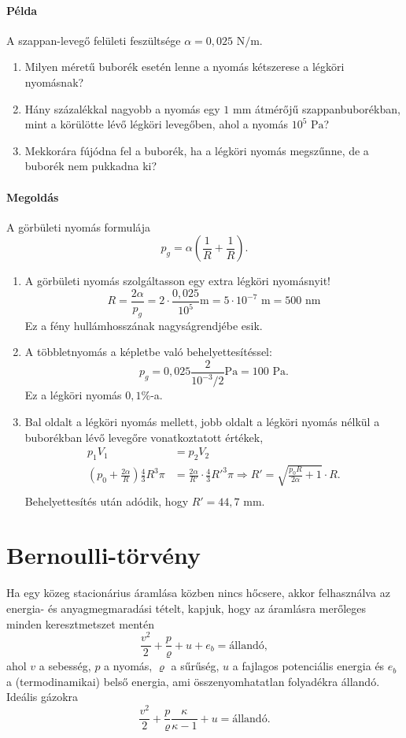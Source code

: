 \documentclass[12pt,a4paper]{scrartcl}
\begin{document}
\paragraph{Példa}
A szappan-levegő felületi feszültsége $\alpha = 0{,}025\text{ N}/\text{m}$. 
\begin{enumerate}
\item  Milyen méretű buborék esetén lenne a nyomás kétszerese a légköri nyomásnak? 
\item Hány százalékkal nagyobb a nyomás egy $1\text{ mm}$ átmérőjű szappanbuborékban, mint a körülötte lévő légköri levegőben, ahol a nyomás $10^5\text{ Pa}$?
\item Mekkorára fújódna fel a buborék, ha a légköri nyomás megszűnne, de a buborék nem pukkadna ki?
\end{enumerate}

\paragraph{Megoldás}
A görbületi nyomás formulája
\[{p_g} = \alpha \left( {\frac{1}{R} + \frac{1}{R}} \right).\]
\begin{enumerate}
\item A görbületi nyomás szolgáltasson egy extra légköri nyomásnyit!
\[R = \frac{{2\alpha }}{p_g} = 2 \cdot \frac{{0{,}025}}{{{{10}^5}}}{\text{m}} = 5 \cdot {10^{ - 7}}{\text{ m}} = 500{\text{ nm}}\]
Ez a fény hullámhosszának nagyságrendjébe esik.
\item A többletnyomás a képletbe való behelyettesítéssel:
\[{p_g} = 0{,}025\frac{2}{{{{10}^{ - 3}}/2}}{\text{Pa}} = 100{\text{ Pa}}.\]
Ez a légköri nyomás $0{,}1\%$-a.
\item Bal oldalt a légköri nyomás mellett, jobb oldalt a légköri nyomás nélkül a buborékban lévő levegőre vonatkoztatott értékek, 
\[\begin{aligned}
  {p_1}{V_1} &  = {p_2}{V_2} \\ 
  \left( {{p_0} + \frac{{2\alpha }}{R}} \right)\frac{4}{3}{R^3}\pi  &  = \frac{{2\alpha }}{{R'}} \cdot \frac{4}{3}R{'^3}\pi  \Rightarrow R' = \sqrt {\frac{{{p_0}R}}{{2\alpha }} + 1}  \cdot R. \\ 
\end{aligned} \]
Behelyettesítés után adódik, hogy $R' = 44{,}7{\text{ mm}}$.
\end{enumerate}
\normalsize

\section{Bernoulli-törvény}
Ha egy közeg stacionárius áramlása közben nincs hőcsere, akkor felhasználva az energia- és anyagmegmaradási tételt, kapjuk, hogy az áramlásra merőleges minden keresztmetszet mentén
\begin{equation} \label{eq:bernulli}
\frac{{{v^2}}}{2} + \frac{p}{\varrho } + u + {e_b} = {\text{állandó}},
\end{equation}
ahol $v$ a sebesség, $p$ a nyomás, $\varrho$ a sűrűség, $u$ a fajlagos potenciális energia és $e_b$ a (termodinamikai) belső energia, ami összenyomhatatlan folyadékra állandó. Ideális gázokra
\[\frac{{{v^2}}}{2} + \frac{p}{\varrho }\frac{\kappa }{{\kappa  - 1}} + u = {\text{állandó.}}\]
\end{document}
